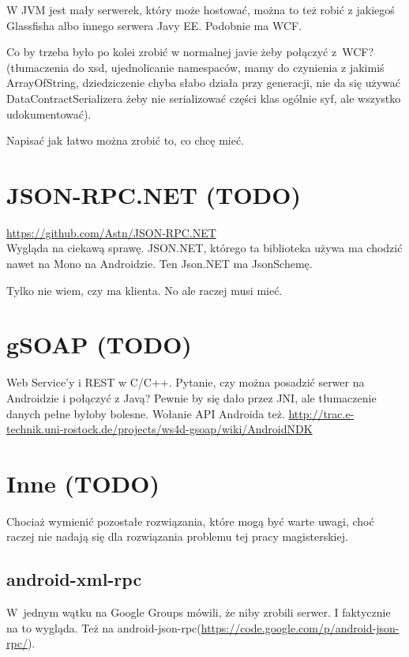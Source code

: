 W JVM jest mały serwerek, który może hostować, można to też robić z jakiegoś Glassfisha albo innego serwera Javy EE\@. Podobnie ma WCF.

Co by trzeba było po kolei zrobić w normalnej javie żeby połączyć z~WCF? (tłumaczenia do xsd, ujednolicanie namespaców, mamy do czynienia z jakimiś ArrayOfString, dziedziczenie chyba słabo działa przy generacji, nie da się używać DataContractSerializera żeby nie serializować części klas ogólnie syf, ale wszystko udokumentować). 

Napisać jak łatwo można zrobić to, co chcę mieć.



\section{JSON-RPC.NET (TODO)}
\url{https://github.com/Astn/JSON-RPC.NET} \\
Wygląda na ciekawą sprawę. JSON.NET, którego ta biblioteka używa ma chodzić nawet na Mono na Androidzie. Ten Json.NET ma JsonSchemę.

Tylko nie wiem, czy ma klienta. No ale raczej musi mieć.



\section{gSOAP (TODO)}
Web Service'y i REST w C/C++. Pytanie, czy można posadzić serwer na Androidzie i połączyć z Javą?
Pewnie by się dało przez JNI, ale tłumaczenie danych pełne byłoby bolesne. Wołanie API Androida też.
\url{http://trac.e-technik.uni-rostock.de/projects/ws4d-gsoap/wiki/AndroidNDK}\\ 



\section{Inne (TODO)}
Chociaż wymienić pozostałe rozwiązania, które mogą być warte uwagi, choć raczej nie nadają się dla rozwiązania problemu tej pracy magisterskiej.

\subsection{android-xml-rpc}
W~jednym wątku na Google Groups \cite{android-rpc-thread} mówili, że niby zrobili serwer. I faktycznie na to wygląda.
Też na android-json-rpc(\url{https://code.google.com/p/android-json-rpc/}).


